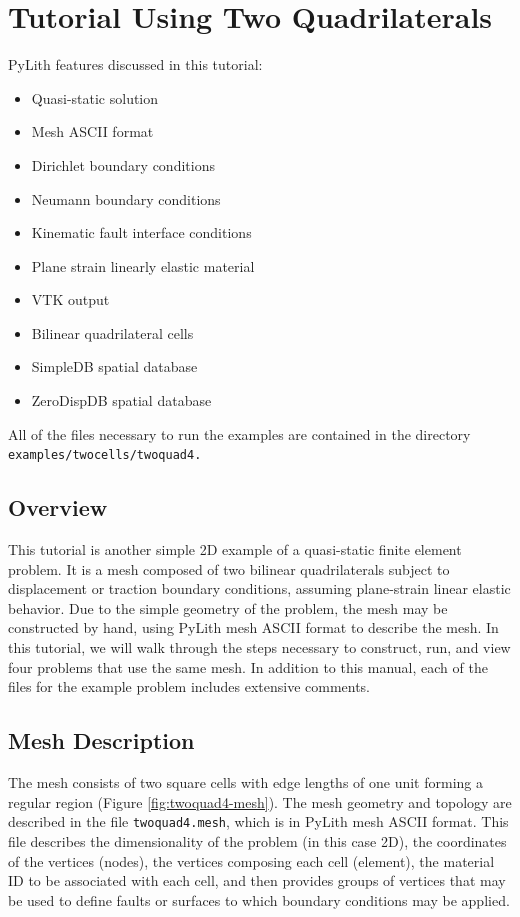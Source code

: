 
\section{\label{sec:Tutorial-Two-quad4}Tutorial Using Two Quadrilaterals}

PyLith features discussed in this tutorial:
\begin{itemize}
\item Quasi-static solution
\item Mesh ASCII format
\item Dirichlet boundary conditions
\item Neumann boundary conditions
\item Kinematic fault interface conditions
\item Plane strain linearly elastic material
\item VTK output
\item Bilinear quadrilateral cells
\item SimpleDB spatial database
\item ZeroDispDB spatial database
\end{itemize}
All of the files necessary to run the examples are contained in the
directory \texttt{examples/twocells/twoquad4.}


\subsection{Overview}

This tutorial is another simple 2D example of a quasi-static finite
element problem. It is a mesh composed of two bilinear quadrilaterals
subject to displacement or traction boundary conditions, assuming
plane-strain linear elastic behavior. Due to the simple geometry of
the problem, the mesh may be constructed by hand, using PyLith mesh
ASCII format to describe the mesh. In this tutorial, we will walk
through the steps necessary to construct, run, and view four problems
that use the same mesh. In addition to this manual, each of the files
for the example problem includes extensive comments.


\subsection{Mesh Description}

The mesh consists of two square cells with edge lengths of one unit
forming a regular region (Figure \ref{fig:twoquad4-mesh}). The mesh
geometry and topology are described in the file \texttt{twoquad4.mesh},
which is in PyLith mesh ASCII format. This file describes the dimensionality
of the problem (in this case 2D), the coordinates of the vertices
(nodes), the vertices composing each cell (element), the material
ID to be associated with each cell, and then provides groups of vertices
that may be used to define faults or surfaces to which boundary conditions
may be applied.

